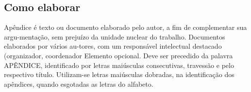 %
%

\begin{apendicesenv}

\chapter{Como elaborar}

Apêndice é texto ou documento elaborado pelo autor, a fim de
complementar sua argu-mentação, sem prejuízo da unidade nuclear do trabalho. Documentos elaborados por vários au-tores, com um responsável intelectual destacado (organizador, coordenador Elemento opcional.  Deve ser precedido da palavra APÊNDICE, identificado por letras maiúsculas consecutivas, travessão e pelo respectivo título. Utilizam-se letras maiúsculas dobradas, na identificação dos apêndices, quando esgotadas as letras do alfabeto.

\end{apendicesenv}
